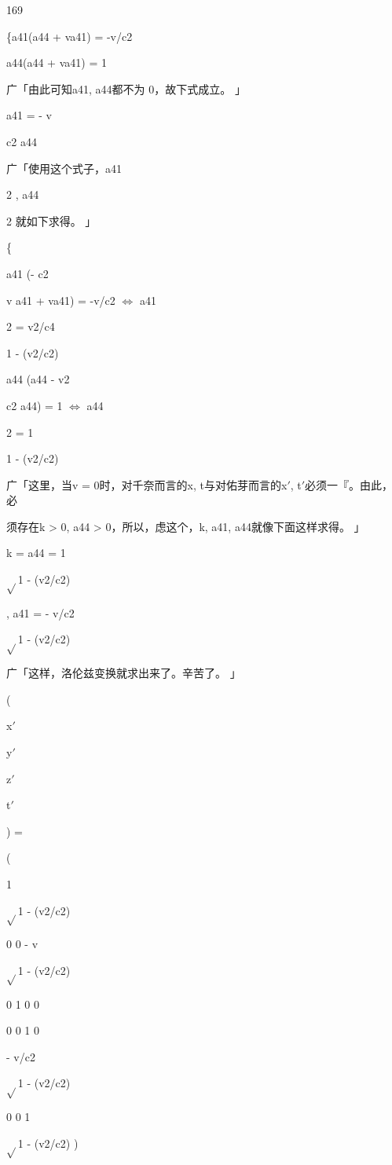 169\par
\{a41(a44 + va41) = -v/c2\par
a44(a44 + va41) = 1\par
广「由此可知a41, a44都不为 0，故下式成立。 」\par
a41 = - v\par
c2 a44\par
广「使用这个式子，a41\par
2 , a44\par
2 就如下求得。 」\par
\{\par
a41 (- c2\par
v a41 + va41) = -v/c2 $\Leftrightarrow$ a41\par
2 = v2/c4\par
1 - (v2/c2)\par
a44 (a44 - v2\par
c2 a44) = 1 $\Leftrightarrow$ a44\par
2 = 1\par
1 - (v2/c2)\par
广「这里，当v = 0时，对千奈而言的x, t与对佑芽而言的x$\prime$, t$\prime$必须一『。由此，必\par
须存在k > 0, a44 > 0，所以，虑这个，k, a41, a44就像下面这样求得。 」\par
k = a44 = 1\par
$\sqrt{}$1 - (v2/c2)\par
, a41 = - v/c2\par
$\sqrt{}$1 - (v2/c2)\par
广「这样，洛伦兹变换就求出来了。辛苦了。 」\par
(\par
x$\prime$\par
y$\prime$\par
z$\prime$\par
t$\prime$\par
) =\par
(\par
1\par
$\sqrt{}$1 - (v2/c2)\par
0 0 - v\par
$\sqrt{}$1 - (v2/c2)\par
0 1 0 0\par
0 0 1 0\par
- v/c2\par
$\sqrt{}$1 - (v2/c2)\par
0 0 1\par
$\sqrt{}$1 - (v2/c2) )\par
